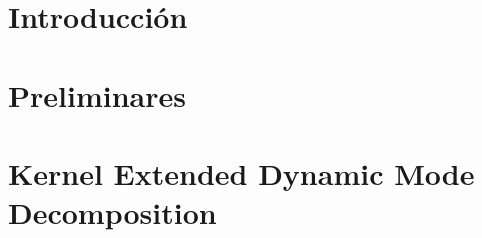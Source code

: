 \documentclass[
	spanish, %
	letterpaper, oneside
]{book}
\begin{document}
\templatePortrait

\templatePagecfg

\begin{abstractd}
	
\end{abstractd}

\begin{dedicatory}

\end{dedicatory}

\begin{acknowledgments}
\end{acknowledgments}

\templateIndex

\templateFinalcfg


\chapter{Introducción}


\chapter{Preliminares}


\chapter{Kernel Extended Dynamic Mode Decomposition}


\end{document}
